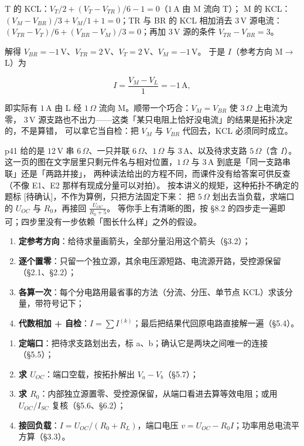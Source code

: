 \documentclass[11pt]{ctexart}
\begin{document}
T 的 KCL：$V_T/2+(V_T-V_{TR})/6-1=0$（$1\,\mathrm{A}$ 由 M 流向 T）；
M 的 KCL：$(V_M-V_{BR})/3+V_M/1+1=0$；TR 与 BR 的 KCL 相加消去 $3\,\mathrm{V}$ 源电流：
$(V_{TR}-V_T)/6+(V_{BR}-V_M)/3=0$；再加 $3\,\mathrm{V}$ 源的条件 $V_{TR}-V_{BR}=3$。

解得 $V_{BR}=-1\,\mathrm{V}$、$V_{TR}=2\,\mathrm{V}$、$V_T=2\,\mathrm{V}$、$V_M=-1\,\mathrm{V}$。
于是 $I$（参考方向 M$\to$L）为

\[ I=\frac{V_M-V_L}{1}=-1\,\mathrm{A} , \]

即实际有 $1\,\mathrm{A}$ 由 L 经 $1\,\Omega$ 流向 M。顺带一个巧合：$V_M=V_{BR}$ 使 $3\,\Omega$ 上电流为零，
$3\,\mathrm{V}$ 源支路也不出力——这类「某只电阻上恰好没电流」的结果是拓扑决定的，不是算错，
可以拿它当自检：把 $V_M$ 与 $V_{BR}$ 代回去，KCL 必须同时成立。


p41 给的是 $12\,\mathrm{V}$ 串 $6\,\Omega$、一只并联 $6\,\Omega$、$1\,\Omega$ 与 $3\,\mathrm{A}$、以及待求支路 $5\,\Omega$（含 $I$）。
这一页的图在文字层里只剩元件名与相对位置，$1\,\Omega$ 与 $3\,\mathrm{A}$ 到底是「同一支路串联」还是「两路并接」，
两种读法给出的方程不同，而课件没有给答案可供反查（不像 E1、E2 那样有现成分量可以对拍）。
按本讲义的规矩，这种拓扑不确定的题标 [待确认]，不作为算例，只把方法固定下来：
把 $5\,\Omega$ 划出去当负载，求端口的 $U_{OC}$ 与 $R_0$，再接回 $\frac{U_{OC}}{R_0+5}$。
等你手上有清晰的图，按 §8.2 的四步走一遍即可；四步里没有一步依赖「图长什么样」之外的假设。



\begin{enumerate}
\item \textbf{定参考方向}：给待求量画箭头，全部分量沿用这个箭头（§3.2）；
\item \textbf{逐个置零}：只留一个独立源，其余电压源短路、电流源开路，受控源保留（§2.1、§2.2）；
\item \textbf{各算一次}：每个分电路用最省事的方法（分流、分压、单节点 KCL）求该分量，带符号记下；
\item \textbf{代数相加 + 自检}：$I=\sum I^{(k)}$；最后把结果代回原电路直接解一遍（§5.4）。
\end{enumerate}


\begin{enumerate}
\item \textbf{定端口}：把待求支路划出去，标 a、b；确认它是两块之间唯一的连接（§5.5）；
\item \textbf{求 $U_{OC}$}：端口空载，按拓扑解出 $V_a-V_b$（§5.7）；
\item \textbf{求 $R_0$}：内部独立源置零、受控源保留，从端口看进去算等效电阻；或用 $U_{OC}/I_{SC}$ 复核（§5.6、§6.2）；
\item \textbf{接回负载}：$I=U_{OC}/(R_0+R_L)$，端口电压 $v=U_{OC}-R_0I$；功率用总电流平方算（§3.3）。
\end{enumerate}
\end{document}
